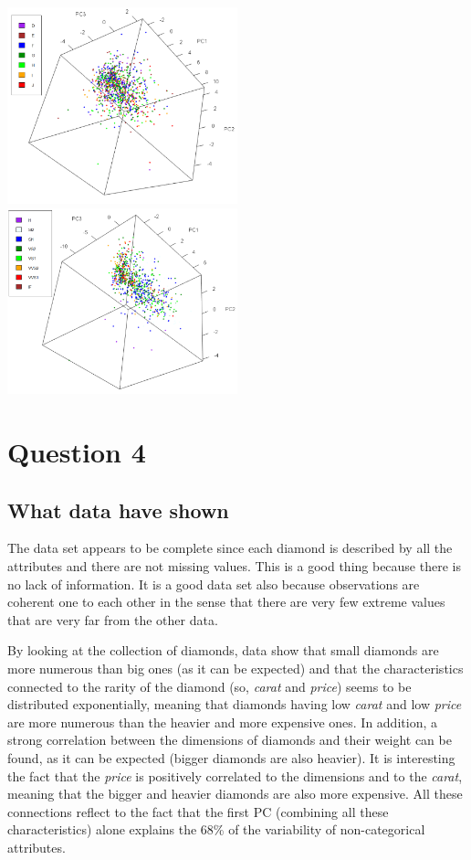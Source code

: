 \documentclass[
]{article}
\begin{document}
\includegraphics[width=0.5\textwidth,height=\textheight]{Images/PCcolor_Image.png}
\includegraphics[width=0.5\textwidth,height=\textheight]{Images/PCclarity_Image.png}

\newpage

\section{Question 4}\label{question-4}

\subsection{What data have shown}\label{what-data-have-shown}

The data set appears to be complete since each diamond is described by
all the attributes and there are not missing values. This is a good
thing because there is no lack of information. It is a good data set
also because observations are coherent one to each other in the sense
that there are very few extreme values that are very far from the other
data.

By looking at the collection of diamonds, data show that small diamonds
are more numerous than big ones (as it can be expected) and that the
characteristics connected to the rarity of the diamond (so, \emph{carat}
and \emph{price}) seems to be distributed exponentially, meaning that
diamonds having low \emph{carat} and low \emph{price} are more numerous
than the heavier and more expensive ones. In addition, a strong
correlation between the dimensions of diamonds and their weight can be
found, as it can be expected (bigger diamonds are also heavier). It is
interesting the fact that the \emph{price} is positively correlated to
the dimensions and to the \emph{carat}, meaning that the bigger and
heavier diamonds are also more expensive. All these connections reflect
to the fact that the first PC (combining all these characteristics)
alone explains the 68\% of the variability of non-categorical
attributes.
\end{document}
